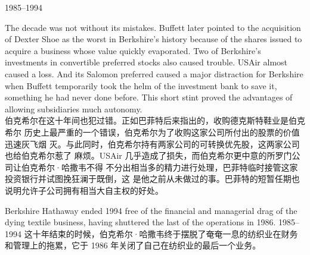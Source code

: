 \begin{section}{1985--1994}
\begin{verseparallel}
  {
    The decade was not without its mistakes. Buffett later pointed to the
    acquisition of Dexter Shoe as the worst in Berkshire's history because of
    the shares issued to acquire a business whose value quickly evaporated. Two
    of Berkshire's investments in convertible preferred stocks also caused
    trouble. USAir almost caused a loss. And its Salomon preferred caused a
    major distraction for Berkshire when Buffett temporarily took the helm of
    the investment bank to save it, something he had never done before. This
    short stint proved the advantages of allowing subsidiaries much autonomy. \\
  }
  {
    伯克希尔在这十年间也犯过错。正如巴菲特后来指出的，收购德克斯特鞋业是伯克希尔
    历史上最严重的一个错误，伯克希尔为了收购这家公司所付出的股票的价值迅速灰飞烟
    灭。与此同时，伯克希尔持有两家公司的可转换优先股，这两家公司也给伯克希尔惹了
    麻烦。USAir 几乎造成了损失，而伯克希尔更中意的所罗门公司让伯克希尔·哈撒韦不得
    不分出相当多的精力进行处理，巴菲特临时接管这家投资银行并试图挽狂澜于既倒，这
    是他之前从未做过的事。巴菲特的短暂任期也说明允许子公司拥有相当大自主权的好处。
  }
\end{verseparallel}

\begin{verseparallel}
  {
    Berkshire Hathaway ended 1994 free of the financial and managerial drag of
    the dying textile business, having shuttered the last of the operations in
    1986.
  }
  {
    1985--1994 这十年结束的时候，伯克希尔·哈撒韦终于摆脱了奄奄一息的纺织业在财务
    和管理上的拖累，它于 1986 年关闭了自己在纺织业的最后一个业务。
  }
\end{verseparallel}
\end{section}

